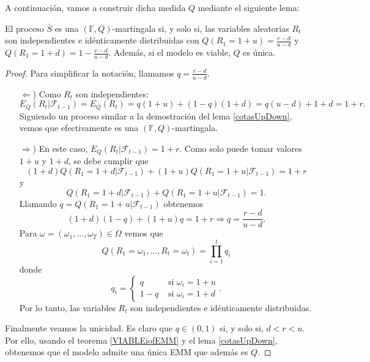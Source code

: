 A continuación, vamos a construir dicha medida $ Q $ mediante el siguiente lema:
\bigskip
\begin{lemaBox}
	El proceso $ \bar{S} $ es una $ (\mathbb{F},Q) $-martingala si, y solo si, las variables aleatorias $ R_t $ son independientes e idénticamente distribuidas con $ Q(R_1 = 1+u) = \frac{r-d}{u-d}$ y $ Q(R_1 = 1+d) = 1- \frac{r-d}{u-d} $. Además, si el modelo es viable, $ Q $ es única.
\end{lemaBox} 
\begin{proof}
	Para simplificar la notación, llamamos $ q =  \frac{r-d}{u-d}$.
	\begin{itemize}
		\item[$ \Longleftarrow $)] Como $ R_t $ son independientes:
		\[
		E_Q(R_t | \mathcal{F}_{t-1}) = E_Q(R_t) = q(1+u) + (1-q)(1+d) = q(u-d) + 1 +d = 1+r.
		\]
		Siguiendo un proceso similar a la demostración del lema \ref{cotasUpDown}, vemos que efectivamente es una $ (\mathbb{F},Q) $-martingala.
		\item[$ \Longrightarrow $)] En este caso, $ E_Q(R_t | \mathcal{F}_{t-1}) = 1+r $. Como solo puede tomar valores $ 1+u $ y $ 1+d $, se debe cumplir que
		\[
		(1+d)Q(R_1 = 1+d | \mathcal{F}_{t-1}) + (1+u)Q(R_1 = 1+u | \mathcal{F}_{t-1}) = 1+r
		\]
		y
		\[
		Q(R_1 = 1+d | \mathcal{F}_{t-1}) + Q(R_1 = 1+u | \mathcal{F}_{t-1}) = 1.
		\]
		Llamando $ q =  Q(R_1 = 1+u | \mathcal{F}_{t-1})$ obtenemos
		\[
		(1+d)(1-q) + (1+u)q = 1+r \Longrightarrow q = \frac{r-d}{u-d}.
		\]
		Para $ \omega = (\omega_1,\dots,\omega_T) \in \Omega $ vemos que
		\[
		Q(R_1 = \omega_1,\dots,R_t = \omega_t) = \prod_{i=1}^{t}q_i
		\]
		donde
		\[
		q_i =  \begin{cases}
		q & \text{ si } \omega_i = 1+u\\
		1-q& \text{ si } \omega_i = 1+d
		\end{cases}.
		\]
		Por lo tanto, las variables $ R_t $ son independientes e idénticamente distribuidas.
	\end{itemize}
	
	Finalmente veamos la unicidad. Es claro que $ q \in (0,1) $ si, y solo si, $ d<r<u $. Por ello, usando el teorema \ref{VIABLEiofEMM} y el lema \ref{cotasUpDown}, obtenemos que el modelo admite una única EMM que además es $ Q $.
\end{proof}
\bigskip

